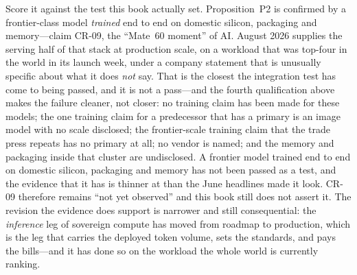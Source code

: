 Score it against the test this book actually set. Proposition~P2 is confirmed by a frontier-class model \emph{trained} end to end on domestic silicon, packaging and memory---claim CR-09, the ``Mate~60 moment'' of AI. August 2026 supplies the serving half of that stack at production scale, on a workload that was top-four in the world in its launch week, under a company statement that is unusually specific about what it does \emph{not} say. That is the closest the integration test has come to being passed, and it is not a pass---and the fourth qualification above makes the failure cleaner, not closer: no training claim has been made for these models; the one training claim for a predecessor that has a primary is an image model with no scale disclosed; the frontier-scale training claim that the trade press repeats has no primary at all; no vendor is named; and the memory and packaging inside that cluster are undisclosed. A frontier model trained end to end on domestic silicon, packaging and memory has not been passed as a test, and the evidence that it has is thinner at \datafreeze than the June headlines made it look. CR-09 therefore remains ``not yet observed'' and this book still does not assert it. The revision the evidence does support is narrower and still consequential: the \emph{inference} leg of sovereign compute has moved from roadmap to production, which is the leg that carries the deployed token volume, sets the standards, and pays the bills---and it has done so on the workload the whole world is currently ranking.

